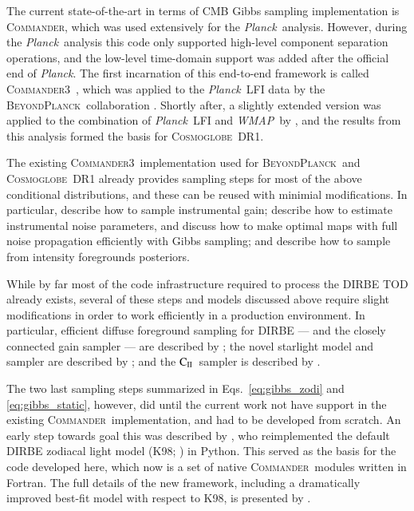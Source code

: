 \documentclass{aa}
\def\Cosmoglobe{\textsc{Cosmoglobe}}
\def\commanderthree{\textsc{Commander3}}
\def\commander{\textsc{Commander}}
\def\Planck{\textit{Planck}}
\def\WMAP{\textit{WMAP}}
\newcommand{\CII}{$\mathrm{C}_{\textsc{II}}$}
\newcommand{\BP}{\textsc{BeyondPlanck}}
\begin{document}
The current state-of-the-art in terms of CMB Gibbs sampling
implementation is \commander \citep{Eriksen:2004ss}, which was used
extensively for the \Planck\ analysis. However, during the
\Planck\ analysis this code only supported high-level component
separation operations, and the low-level time-domain support was added
after the official end of \Planck. The first incarnation of this
end-to-end framework is called \commanderthree\ \citep{bp03}, which
was applied to the \Planck\ LFI data by the \BP\ collaboration
\citep{bp01}. Shortly after, a slightly extended version was applied
to the combination of \Planck\ LFI and \WMAP\ by
\citet{watts2023_dr1}, and the results from this analysis formed the
basis for \Cosmoglobe\ DR1. 

The existing \commanderthree\ implementation used for \BP\ and
\Cosmoglobe\ DR1 already provides sampling steps for most of the above
conditional distributions, and these can be reused with minimial
modifications. In particular, \citet{bp07} describe how to sample
instrumental gain; \citet{bp06} describe how to estimate instrumental
noise parameters, and \citet{bp02} discuss how to make optimal maps
with full noise propagation efficiently with Gibbs sampling; and
\citet{bp13} describe how to sample from intensity foregrounds
posteriors. 

While by far most of the code infrastructure required to process the
DIRBE TOD already exists, several of these steps and models discussed
above require slight modifications in order to work efficiently in a
production environment. In particular, efficient diffuse foreground
sampling for DIRBE --- and the closely connected gain sampler --- are
described by \citet{CG02_05}; the novel starlight model and sampler
are described by \citet{CG02_04}; and the \CII\ sampler is described
by \citet{CG02_06}. 

The two last sampling steps summarized in Eqs.~\eqref{eq:gibbs_zodi}
and \eqref{eq:gibbs_static}, however, did until the current work not
have support in the existing \commander\ implementation, and had to be
developed from scratch. An early step towards goal this was described
by \citet{san:2022}, who reimplemented the default DIRBE zodiacal
light model (K98; \citealp{kelsall1998}) in Python. This served as the
basis for the code developed here, which now is a set of native
\commander\ modules written in Fortran. The full details of the new
framework, including a dramatically improved best-fit model with
respect to K98, is presented by \citet{CG02_02}.
\end{document}
